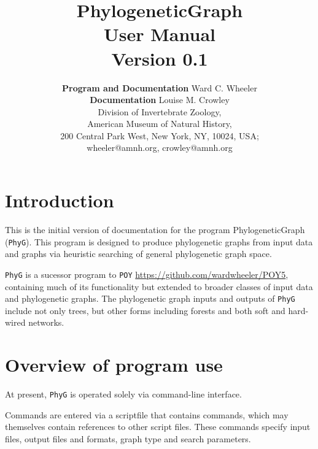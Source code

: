 \documentclass[11pt]{article}
\begin{document}
	
	\title{PhylogeneticGraph\\User Manual\\Version 0.1}
	\author{{\textbf{Program and Documentation}} Ward C. Wheeler\\ {\textbf{Documentation}} Louise M. Crowley\\
		Division of Invertebrate Zoology,\\ American Museum of Natural History,\\ 200 Central Park West, New York, NY, 10024, USA;\\wheeler@amnh.org, crowley@amnh.org}
	
	
	\maketitle
	\newpage
	
	\tableofcontents
	\newpage
	\section{Introduction}
	This is the initial version of documentation for the program PhylogeneticGraph (\texttt{PhyG}).  This program is designed to produce phylogenetic graphs from input data and graphs via heuristic searching of general phylogenetic graph space.
	
	 \texttt{PhyG} is a sucessor program to \texttt{POY} \citep{POY2,POY3,POY4,Varonetal2010,POY5, Wheeleretal2015} \url{https://github.com/wardwheeler/POY5}, containing much of its functionality but extended to broader classes of input data and phylogenetic graphs.
	The phylogenetic graph inputs and outputs of \texttt{PhyG} include not only trees, but other forms including forests and both
	soft and hard-wired networks.
	
	
	
	\section{Overview of program use}
	At present, \texttt{PhyG} is operated solely via command-line interface. 
	
	Commands are entered via a scriptfile that contains commands, which may themselves contain references to other script files.
	These commands specify input files, output files and formats, graph type and search parameters. 
	
\end{document}
